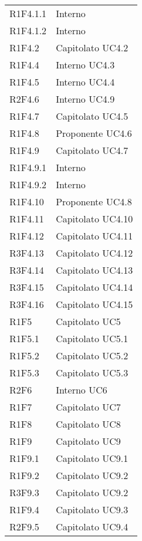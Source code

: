 \begin{longtable} {
			>{\centering}p{28mm}  
			>{}p{20mm}
		}
		R1F4.1.1 & Interno \TBstrut \\ [2mm]
		R1F4.1.2 & Interno \TBstrut \\ [2mm]		
		R1F4.2 & Capitolato UC4.2 \TBstrut \\ [2mm]				
		R1F4.4 & Interno UC4.3 \TBstrut \\ [2mm]
		R1F4.5 & Interno UC4.4 \TBstrut \\ [2mm]
		R2F4.6 & Interno UC4.9 \TBstrut \\ [2mm]
		R1F4.7 & Capitolato UC4.5 \TBstrut \\ [2mm]
		R1F4.8 & Proponente UC4.6 \TBstrut \\ [2mm]
		R1F4.9 & Capitolato UC4.7 \TBstrut \\ [2mm]
		R1F4.9.1 & Interno \TBstrut \\ [2mm]
		R1F4.9.2 & Interno \TBstrut \\ [2mm]
		R1F4.10 & Proponente UC4.8 \TBstrut \\ [2mm]
		R1F4.11 & Capitolato UC4.10 \TBstrut \\ [2mm]
		R1F4.12 & Capitolato UC4.11 \TBstrut \\ [2mm]
		R3F4.13 & Capitolato UC4.12 \TBstrut \\ [2mm]
		R3F4.14 & Capitolato UC4.13 \TBstrut \\ [2mm]
		R3F4.15 & Capitolato UC4.14 \TBstrut \\ [2mm]
		R3F4.16 & Capitolato UC4.15 \TBstrut \\ [2mm]
		R1F5 & Capitolato UC5 \TBstrut \\ [2mm]
		R1F5.1 & Capitolato UC5.1 \TBstrut \\ [2mm]
		R1F5.2 & Capitolato UC5.2 \TBstrut \\ [2mm]
		R1F5.3 & Capitolato UC5.3 \TBstrut \\ [2mm]
		R2F6 & Interno UC6 \TBstrut \\ [2mm]		
		R1F7 & Capitolato UC7 \TBstrut \\ [2mm]
		R1F8 & Capitolato UC8 \TBstrut \\ [2mm]
		R1F9 & Capitolato UC9 \TBstrut \\ [2mm]
		R1F9.1 & Capitolato UC9.1 \TBstrut \\ [2mm]
		R1F9.2 & Capitolato UC9.2 \TBstrut \\ [2mm]
		R3F9.3 & Capitolato UC9.2 \TBstrut \\ [2mm]
		R1F9.4 & Capitolato UC9.3 \TBstrut \\ [2mm]
		R2F9.5 & Capitolato UC9.4 \TBstrut \\ [2mm]

\end{longtable}
